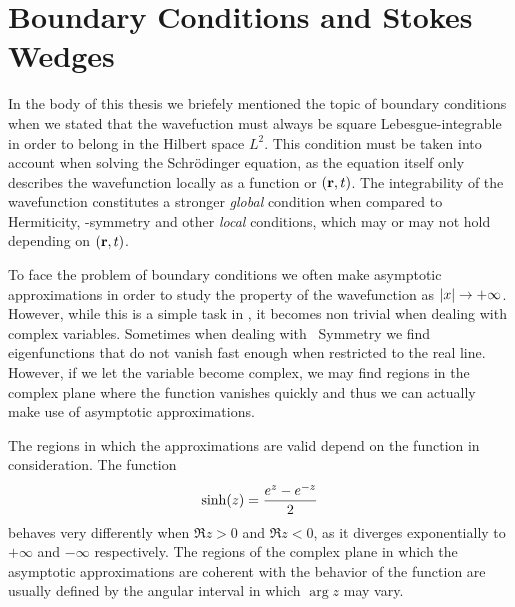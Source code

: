 \chapter{Boundary Conditions and Stokes Wedges}\label{a:stokes}
    In the body of this thesis we briefely mentioned the topic of boundary conditions when we stated that the wavefuction must always be square Lebesgue-integrable in order to belong in the Hilbert space $L^2$. This condition must be taken into account when solving the Schr\"odinger equation, as the equation itself only describes the wavefunction locally as a function or $\pqty{\vb{r},t}$. The integrability of the wavefunction constitutes a stronger \emph{global} condition when compared to Hermiticity, \PT-symmetry and other \emph{local} conditions, which may or may not hold depending on $\pqty{\vb{r},t}$.

    To face the problem of boundary conditions we often make asymptotic approximations in order to study the property of the wavefunction as $\abs{x}\to+\infty$. However, while this is a simple task in \bbR, it becomes non trivial when dealing with complex variables. Sometimes when dealing with \PT\ Symmetry we find eigenfunctions that do not vanish fast enough when restricted to the real line. However, if we let the variable become complex, we may find regions in the complex plane where the function vanishes quickly and thus we can actually make use of asymptotic approximations.

    The regions in which the approximations are valid depend on the function in consideration. The function
    \begin{align*}
        \sinh\!\pqty{z} = \frac{e^z - e^{-z}}{2}
    \end{align*}
    behaves very differently when $\Re z > 0$ and $\Re z < 0$, as it diverges exponentially to $+\infty$ and $-\infty$ respectively. The regions of the complex plane in which the asymptotic approximations are coherent with the behavior of the function are usually defined by the angular interval in which $\arg z$ may vary.